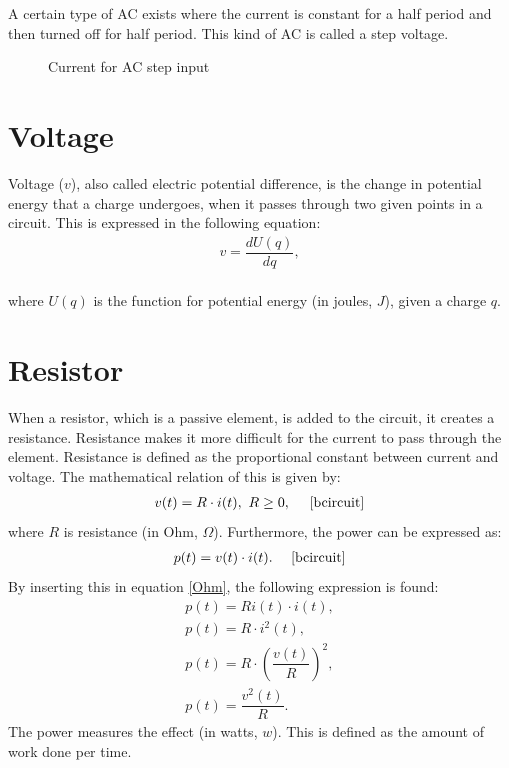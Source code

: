 A certain type of AC exists where the current is constant for a half period and then turned off for half period. This kind of AC is called a step voltage.
\begin{figure}[H] 

\caption{Current for AC step input}
\end{figure}
\section{Voltage}
Voltage ($v$), also called electric potential difference, is the change in potential energy that a charge undergoes, when it passes through two given points in a circuit. This is expressed in the following equation:
\begin{align*}
	v=\dfrac{dU(q)}{dq},
\end{align*}
\\
where $U(q)$ is the function for potential energy (in joules, $J$), given a charge $q$.
\section{Resistor}
When a resistor, which is a passive element, is added to the circuit, it creates a resistance. Resistance makes it more difficult for the current to pass through the element. Resistance is defined as the proportional constant between current and voltage. The mathematical relation of this is given by:
\begin{align} 
\label{Ohm}
v(t)=R\cdot i(t),\ R\geq0,~~~~\text{\cite[page~22]{bcircuit}}
\end{align}
where $R$ is resistance (in Ohm, $\Omega$). Furthermore, the power can be expressed as: \cite[p. 25]{bcircuit} 
\begin{align} 
\label{power}
p(t)=v(t)\cdot i(t).~~~~\text{\cite[p. 25]{bcircuit}}
\end{align}
By inserting this in equation \eqref{Ohm}, the following expression is found:
\begin{align}
p(t)=Ri(t)\cdot i(t), \nonumber \\
p(t)=R \cdot i^2(t), \nonumber \\
p(t)=R \cdot \left(\dfrac{v(t)}{R} \right)^2, \nonumber \\
p(t)=\dfrac{v^2(t)}{R}. \label{resistor:power}
\end{align}
The power measures the effect (in watts, $w$). This is defined as the amount of work done per time. 
